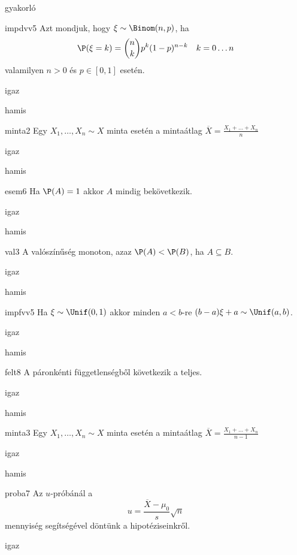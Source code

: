 \documentclass[12pt]{article}
\begin{document}
\begin{quiz}{gyakorló}
\begin{multi}[feedback={Def.}]{impdvv5}
Azt mondjuk, hogy $\xi\sim \Binom(n,p)$, ha 
$$
\P(\xi=k)=\binom{n}{k}p^k(1-p)^{n-k}\ \ \ k=0\ldots n
$$
valamilyen $n>0$ és $p\in[0,1]$ esetén.
\item* igaz
\item hamis
\end{multi}
\begin{multi}[feedback={Definíció}]{minta2}
Egy $X_1,\ldots,X_n\sim X$ minta esetén a mintaátlag $\overline{X}=\frac{X_1+\ldots+X_n}{n}$
\item* igaz
\item hamis
\end{multi}
\begin{multi}[feedback={Például: legyen a kísérlet random húzás a $[0,1]$-ből és $A=\{x\in [0,1]:x\neq \frac{1}{2}\}$}]{esem6}
Ha $\P(A)=1$ akkor $A$ mindig bekövetkezik.
\item igaz
\item* hamis
\end{multi}
\begin{multi}[feedback={$A=B$?}]{val3}
A valószínűség monoton, azaz $\P(A)<\P(B)$, ha $A\subseteq B$.
\item igaz
\item* hamis
\end{multi}
\begin{multi}[feedback={Egyenletes lineáris transzformáltja is egyenletes (a konstans elfajult esettől eltekintve)}]{impfvv5}
Ha $\xi\sim \Unif(0,1)$ akkor minden $a<b$-re $(b-a)\xi+a\sim \Unif(a,b)$.
\item* igaz
\item hamis
\end{multi}
\begin{multi}[feedback={A páronkénti gyengébb tulajdonság.}]{felt8}
A páronkénti függetlenségből következik a teljes.
\item igaz
\item* hamis
\end{multi}
\begin{multi}[feedback={Definíció}]{minta3}
Egy $X_1,\ldots,X_n\sim X$ minta esetén a mintaátlag $\overline{X}=\frac{X_1+\ldots+X_n}{n-1}$
\item igaz
\item* hamis
\end{multi}
\begin{multi}[feedback={A fenti formula az $t$-próba ún. próbastatisztikája.}]{proba7}
Az $u$-próbánál a 
$$
u=\frac{\overline{X}-\mu_0}{s}\sqrt{n}
$$
mennyiség segítségével döntünk a hipotéziseinkről.
\item igaz

\end{multi}
\end{quiz}
\end{document}
